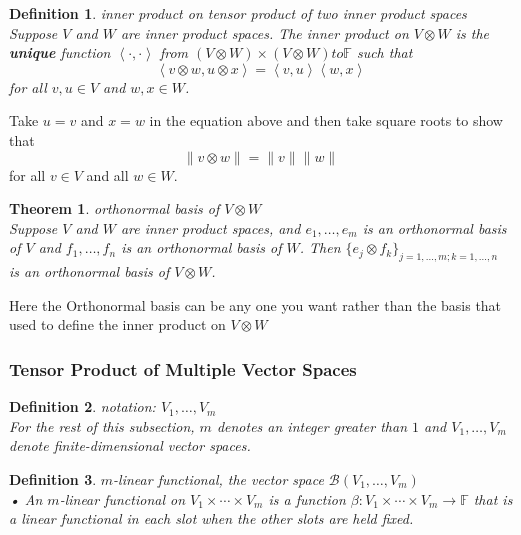 \documentclass{article}
\newtheorem{theorem}{Theorem}[subsection]
\newtheorem{definition}{Definition}[subsection]
\newcommand{\FF}{\mathbb{F}}
\begin{document}
\begin{CJK}{UTF8}{gkai}
\begin{definition}
    inner product on tensor product of two inner product spaces\\

    Suppose $V$ and $W$ are inner product spaces. The inner product on $V\otimes W$ is the \textbf{unique} function $\left<\cdot,\cdot\right>$ from $(V\otimes W) \times (V\otimes W) to \FF$ such that
    \[\left<v \otimes w,u \otimes x\right> = \left<v,u\right>\left<w,x\right>\]
    for all $v,u \in V$ and $w,x \in W$.
\end{definition}

    Take $u = v$ and $x = w$ in the equation above and then take square roots to show that
    \[\|v \otimes w\| = \|v\| \|w\|\]
    for all $v \in V$ and all $w \in W$.
 
\begin{theorem}
    orthonormal basis of $V \otimes W$\\

    Suppose $V$ and $W$ are inner product spaces, and $e_1,\ldots,e_m$ is an orthonormal basis of $V$ and $f_1,\ldots, f_n$ is an orthonormal basis of $W$. Then $\{e_j \otimes f_k\}_{j=1,\ldots,m;k=1,\ldots,n}$ is an orthonormal basis of $V \otimes W$.
\end{theorem}

Here the Orthonormal basis can be any one you want rather than the basis that used to define the inner product on $V \otimes W$\\

\subsubsection{Tensor Product of Multiple Vector Spaces}

\begin{definition}
    notation: $V_1,\ldots,V_m$\\

    For the rest of this subsection, $m$ denotes an integer greater than $1$ and $V_1, \ldots,V_m$ denote finite-dimensional vector spaces.
\end{definition}

\begin{definition}
    $m$-linear functional, the vector space $\mathcal{B}(V_1,\ldots,V_m)$\\

    • An $m$-linear functional on $V_1 \times \cdots \times V_m$ is a function $\beta: V_1 \times \cdots\times V_m \to \FF$ that is a linear functional in each slot when the other slots are held fixed.


\end{definition}
\end{CJK}
\end{document}
